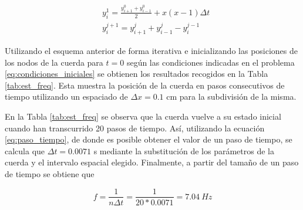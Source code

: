 \documentclass[11pt]{article}
\begin{document}
\begin{subequations}
\begin{flalign}
	&y^1_i = \frac{y^0_{i+1} + y^0_{i-1}}{2} + x(x-1)\Delta{t}\\
	&y^{j+1}_i = y^j_{i+1} + y^j_{i-1} - y^{j-1}_i
\end{flalign}
\end{subequations}

Utilizando el esquema anterior de forma iterativa e inicializando las posiciones de
los nodos de la cuerda para $t=0$ según las condiciones indicadas en el problema
\eqref{eq:condiciones_iniciales} se obtienen los resultados recogidos en la Tabla 
\ref{tab:est_freq}. Esta muestra la posición de la cuerda en pasos consecutivos de tiempo 
utilizando un espaciado de $\Delta{x} = 0.1$ cm para la subdivisión de la misma.

En la Tabla \ref{tab:est_freq} se observa que la cuerda vuelve a su estado inicial cuando
han transcurrido 20 pasos de tiempo. Así, utilizando la ecuación \eqref{eq:paso_tiempo},
de donde es posible obtener el valor de un paso de tiempo, se calcula que
$\Delta{t} = 0.0071$ s mediante la substitución de los parámetros de la cuerda y el
intervalo espacial elegido. Finalmente, a partir del tamaño de un paso de tiempo se
obtiene que

\begin{equation}
f = \frac{1}{n \Delta{t}} = \frac{1}{20 * 0.0071} = 7.04~Hz
\end{equation}
\end{document}
